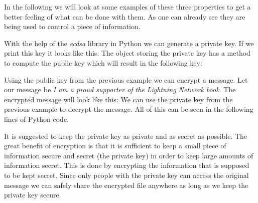 \documentclass[a4paper,12pt,oneside,openany]{book}
\begin{document}

In the following we will look at some examples of these three properties to get a better feeling of what can be done with them.
As one can already see they are being used to control a piece of information.

With the help of the \textit{ecdsa} library in Python we can generate a private key.
If we print this key it looks like this: 
The object storing the private key has a method to compute the public key which will result in the following key: 

Using the public key from the previous example we can encrypt a message.
Let our message be \textit{I am a proud supporter of the Lightning Network book}.
The encrypted message will look like this: 
We can use the private key from the previous example to decrypt the message.
All of this can be seen in the following lines of Python code.


It is suggested to keep the private key as private and as secret as possible.
The great benefit of encryption is that it is sufficient to keep a small piece of information secure and secret (the private key) in order to keep large amounts of information secret.
This is done by encrypting the information that is supposed to be kept secret.
Since only people with the private key can access the original message we can safely share the encrypted file anywhere as long as we keep the private key secure.
\end{document}
